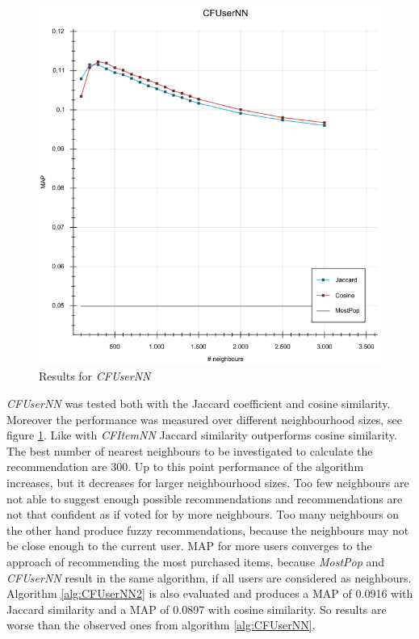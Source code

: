 \documentclass[10pt]{reportMaster}
\begin{document}
\begin{figure}
	\centering
	\includegraphics[width=1\textwidth]{figures/experiments/CFUserNN}
	\caption{Results for \textit{CFUserNN}}
	\label{fig:CFUserNN}
\end{figure}

\textit{CFUserNN} was tested both with the Jaccard coefficient and cosine similarity.
Moreover the performance was measured over different neighbourhood sizes, see figure \ref{fig:CFUserNN}.
Like with \textit{CFItemNN} Jaccard similarity outperforms cosine similarity.
The best number of nearest neighbours to be investigated to calculate the recommendation are 300.
Up to this point performance of the algorithm increases, but it decreases for larger neighbourhood sizes.
Too few neighbours are not able to suggest enough possible recommendations and recommendations are not that confident as if voted for by more neighbours.
Too many neighbours on the other hand produce fuzzy recommendations, because the neighbours may not be close enough to the current user.
MAP for more users converges to the approach of recommending the most purchased items, because \textit{MostPop} and \textit{CFUserNN} result in the same algorithm, if all users are considered as neighbours.
Algorithm \ref{alg:CFUserNN2} is also evaluated and produces a MAP of 0.0916 with Jaccard similarity and a MAP of 0.0897 with cosine similarity.
So results are worse than the observed ones from algorithm \ref{alg:CFUserNN}.
\end{document}
